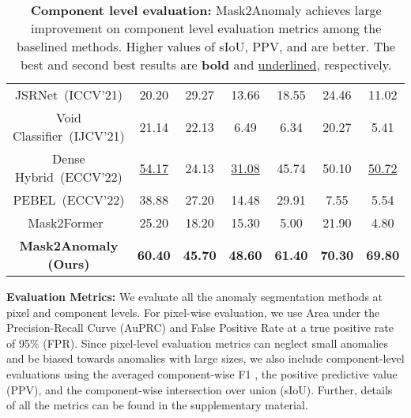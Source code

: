 \documentclass[10pt,twocolumn,letterpaper]{article}
\newcommand{\myparagraph}[1]{\vspace{3pt}\noindent\textbf{#1}}
\begin{document}
\begin{table}[!ht]
{\begin{tabular}{c|ccc|ccc}
JSRNet~\cite{vojir2021road}(ICCV'21) &		20.20  &		29.27 	 &	13.66 	 &	18.55 	 &	24.46  &		11.02 	\\
Void Classifier~\cite{blum2021fishyscapes}(IJCV'21)&	21.14 	 &	22.13  &		6.49  &		6.34  &		20.27  &		5.41  \\
Dense Hybrid~\cite{grcic2022densehybrid}(ECCV'22)&	\underline{54.17} &		24.13 &		\underline{31.08} &		45.74	 &	50.10	 &	\underline{50.72}	\\
PEBEL~\cite{tian2022pixel}(ECCV'22) &	38.88	 &	27.20	 &	14.48	 &	29.91	 &	 7.55 &		5.54	\\
\hline
Mask2Former~\cite{cheng2022masked}    &		25.20 	 &	18.20  &		15.30  &		5.00 	 &	21.90  &		4.80   \\
\textbf{Mask2Anomaly (Ours)}   &		\textbf{60.40}  &		\textbf{45.70}  &		\textbf{48.60}  &	 	\textbf{61.40}  &		\textbf{70.30}  &		\textbf{69.80} 	  \\
\end{tabular}}
\caption{\textbf{Component level evaluation:} Mask2Anomaly achieves large improvement on component level evaluation metrics among the baselined methods. Higher values of sIoU, PPV, and   are better. The best and second best results are \textbf{bold} and \underline{underlined}, respectively.
} 
\vspace{-1em}
\label{tab:comp-eval} 
\end{table}
 
\myparagraph{Evaluation Metrics:} We evaluate all the anomaly segmentation methods at pixel and component levels. For pixel-wise evaluation, we use Area under the Precision-Recall Curve (AuPRC) and False Positive Rate at a true positive rate of 95\% (FPR). Since pixel-level evaluation metrics can neglect small anomalies and be biased towards anomalies with large sizes, we also include component-level evaluations using the averaged component-wise F1 , the positive predictive value (PPV), and the component-wise intersection over union (sIoU). Further, details of all the metrics can be found in the supplementary material.
\end{document}
